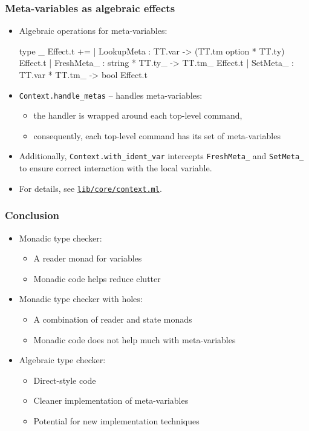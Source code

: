 \documentclass[11pt,aspectratio=169,fleqn]{beamer}
\newcommand{\codeRef}[1]{\href{https://github.com/andrejbauer/faux-type-theory/blob/main/algebraic-fauxtt/#1}{\texttt{#1}}}
\begin{document}
\begin{frame}[fragile]
  \frametitle{Meta-variables as algebraic effects}

  \begin{itemize}
\item Algebraic operations for meta-variables:
    {\small
\begin{ocamllisting}
type _ Effect.t +=
    | LookupMeta : TT.var -> (TT.tm option * TT.ty) Effect.t
    | FreshMeta_ : string * TT.ty_ -> TT.tm_ Effect.t
    | SetMeta_ : TT.var * TT.tm_ -> bool Effect.t
\end{ocamllisting}
    }

  \item \pause
    \lstinline{Context.handle_metas} -- handles meta-variables:
    \begin{itemize}
    \item the handler is wrapped around each top-level command,
    \item consequently, each top-level command has its set of meta-variables
    \end{itemize}
  \item \pause
    Additionally, \lstinline{Context.with_ident_var} intercepts \lstinline{FreshMeta_} and \lstinline{SetMeta_} to ensure correct interaction with the local variable.
  \item For details, see \codeRef{lib/core/context.ml}.
  \end{itemize}
\end{frame}

\begin{frame}
  \frametitle{Conclusion}

  \begin{itemize}
  \item Monadic type checker:
    \begin{itemize}
    \item A reader monad for variables
    \item Monadic code helps reduce clutter
    \end{itemize}
  \item Monadic type checker with holes:
    \begin{itemize}
    \item A combination of reader and state monads
    \item Monadic code does not help much with meta-variables
    \end{itemize}
  \item Algebraic type checker:
    \begin{itemize}
    \item Direct-style code
    \item Cleaner implementation of meta-variables
    \item Potential for new implementation techniques
    \end{itemize}
  \end{itemize}
\end{frame}
\end{document}
